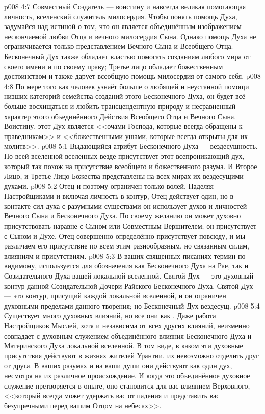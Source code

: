 \vs p008 4:7 \pc Совместный Создатель --- воистину и навсегда великая помогающая личность, вселенский служитель милосердия. Чтобы понять помощь Духа, задумайся над истиной о том, что он является объединённым изображением нескончаемой любви Отца и вечного милосердия Сына. Однако помощь Духа не ограничивается только представлением Вечного Сына и Всеобщего Отца. Бесконечный Дух также обладает властью помогать созданиям любого мира от своего имени и по своему праву; Третье лицо обладает божественным достоинством и также дарует всеобщую помощь милосердия от самого себя.
\vs p008 4:8 По мере того как человек узнаёт больше о любящей и неустанной помощи низших категорий семейства созданий этого Бесконечного Духа, он будет всё больше восхищаться и любить трансцендентную природу и несравненный характер этого объединённого Действия Всеобщего Отца и Вечного Сына. Воистину, этот Дух является <<очами Господа, которые всегда обращены к праведникам>> и <<божественными ушами, которые всегда открыты для их молитв>>.
\vs p008 5:1 Выдающийся атрибут Бесконечного Духа --- вездесущность. По всей вселенной вселенных везде присутствует этот всепроникающий дух, который так похож на присутствие всеобщего и божественного разума. И Второе Лицо, и Третье Лицо Божества представлены на всех мирах их вездесущими духами.
\vs p008 5:2 Отец  и поэтому ограничен только волей. Наделяя Настройщиками и включая личность в контур, Отец действует один, но в контакте сил духа с разумными существами он использует духов и личностей Вечного Сына и Бесконечного Духа. По своему желанию он может духовно присутствовать наравне с Сыном или Совместным Вершителем; он присутствует  с Сыном и  Духе. Отец совершенно определённо присутствует повсюду, и мы различаем его присутствие по всем этим разнообразным, но связанным силам, влияниям и присутствиям.
\vs p008 5:3 \pc В ваших священных писаниях термин  по\hyp{}видимому, используется для обозначения как Бесконечного Духа на Рае, так и Созидательного Духа вашей локальной вселенной. Святой Дух --- это духовный контур данной Созидательной Дочери Райского Бесконечного Духа. Святой Дух --- это контур, присущий каждой локальной вселенной, и он ограничен духовными пределами данного творения; но Бесконечный Дух вездесущ.
\vs p008 5:4 \pc Существует много духовных влияний, но все они как . Даже работа Настройщиков Мыслей, хотя и независима от всех других влияний, неизменно совпадает с духовным служением объединённого влияния Бесконечного Духа и Материнского Духа локальной вселенной. В том виде, в каком эти духовные присутствия действуют в жизнях жителей Урантии, их невозможно отделить друг от друга. В ваших разумах и на ваши души они действуют как один дух, несмотря на их различное происхождение. И когда это объединённое духовное служение претворяется в опыте, оно становится для вас влиянием Верховного, <<который всегда может удержать вас от падения и представить вас безупречными перед вашим Отцом на небесах>>.
